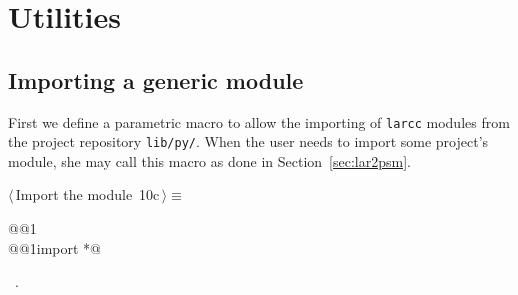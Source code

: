 \documentclass[11pt,oneside]{article}	%
\begin{document}
\appendix
\section{Utilities}

\subsection{Importing a generic module}
First we define a parametric macro to allow the importing of \texttt{larcc} modules from the project repository \texttt{lib/py/}. When the user needs to import some project's module, she may call this macro as done in Section~\ref{sec:lar2psm}.
\begin{flushleft} \small
\begin{minipage}{\linewidth} \label{scrap20}
\protect{}$\langle\,$Import the module\nobreak\ {\footnotesize 10c}$\,\rangle\equiv$
\vspace{-1ex}
\begin{list}{}{} \item
\mbox{}\verb@import @@1\verb@@\\
\mbox{}\verb@from @@1\verb@ import *@\\
\mbox{}\verb@@{\NWsep}
\end{list}
\vspace{-1ex}
\footnotesize\addtolength{\baselineskip}{-1ex}
\begin{list}{}{\setlength{\itemsep}{-\parsep}\setlength{\itemindent}{-\leftmargin}}
\item \NWtxtMacroRefIn\ .
\end{list}
\end{minipage}\\[4ex]
\end{flushleft}
\end{document}
